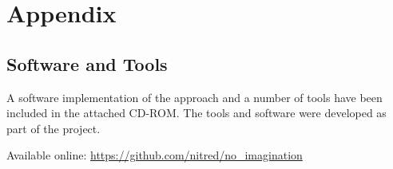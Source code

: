 \section{Appendix}
\subsection{Software and Tools}
A software implementation of the approach and a number of tools have been included in the attached CD-ROM. The tools and software were developed as part of the project.

Available online: \url{https://github.com/nitred/no_imagination} 
